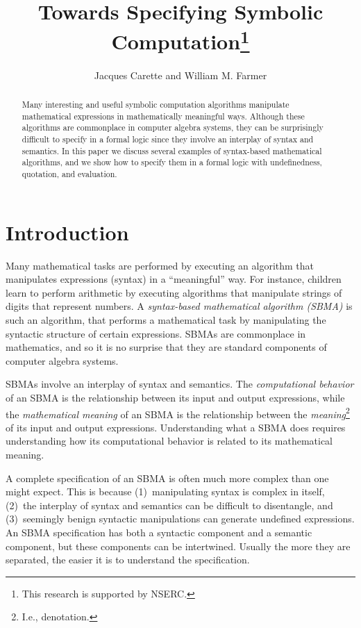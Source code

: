 \documentclass[fleqn]{llncs}
\title{Towards Specifying Symbolic Computation\thanks{This research is
    supported by NSERC.}}
\author{Jacques Carette and William M. Farmer}
\institute{%
Computing and Software, McMaster University, Canada\\
\url{http://www.cas.mcmaster.ca/~carette}\\
\url{http://imps.mcmaster.ca/wmfarmer}%
}
\begin{document}
\maketitle

\begin{abstract}
\bsp
Many interesting and useful symbolic computation algorithms manipulate
mathematical expressions in mathematically meaningful ways.  Although
these algorithms are commonplace in computer algebra systems, they can
be surprisingly difficult to specify in a formal logic since they
involve an interplay of syntax and semantics.  In this paper we
discuss several examples of syntax-based mathematical algorithms, and
we show how to specify them in a formal logic with undefinedness,
quotation, and evaluation.
\esp
\end{abstract}

\iffalse

\textbf{Keywords:} Symbolic computation, computer algebra systems,
reasoning about syntax, undefinedness, quotation and evaluation.

\fi

\section{Introduction}

Many mathematical tasks are performed by executing an algorithm that
manipulates expressions (syntax) in a ``meaningful'' way.  For instance,
children learn to perform arithmetic by executing algorithms that manipulate
strings of digits that represent numbers.  A \emph{syntax-based
mathematical algorithm (SBMA)} is such an algorithm, that performs a
mathematical task by manipulating the syntactic structure of certain
expressions.  SBMAs are commonplace in mathematics, and so it is no surprise
that they are standard components of computer algebra systems.

SBMAs involve an interplay of syntax and semantics.  The
\emph{computational behavior} of an SBMA is the relationship between
its input and output expressions, while the \emph{mathematical meaning} of an
SBMA is the relationship between the \emph{meaning}\footnote{I.e., denotation.}
of its input and output expressions.  Understanding what a SBMA does requires
understanding how its computational behavior is related to its mathematical
meaning.

A complete specification of an SBMA is often much more complex than
one might expect.  This is because (1)~manipulating syntax is complex
in itself, (2)~the interplay of syntax and semantics can be difficult
to disentangle, and (3)~seemingly benign syntactic
manipulations can generate undefined expressions.  An SBMA
specification has both a syntactic component and a semantic component,
but these components can be intertwined.  Usually the more they are
separated, the easier it is to understand the specification.
\end{document}
